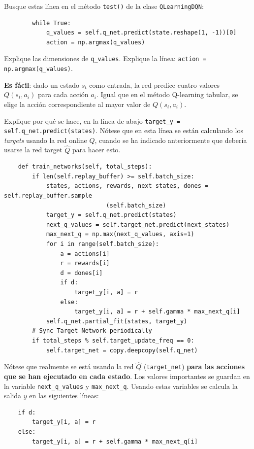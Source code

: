 \documentclass{article}
\begin{document}
\begin{exercise}
    Busque estas línea en el método \texttt{test()} de la clase \texttt{QLearningDQN}:
    
    \begin{verbatim}
        while True:
            q_values = self.q_net.predict(state.reshape(1, -1))[0]
            action = np.argmax(q_values)
    \end{verbatim}
    Explique las dimensiones de \texttt{q\_values}. Explique la línea: \texttt{action = np.argmax(q\_values)}.
\end{exercise}
\textbf{Es fácil}: dado un estado $s_t$ como entrada, la red predice cuatro valores $Q(s_t, a_i)$ para cada acción $a_i$. Igual que en el método Q-learning tabular, se elige la acción correspondiente al mayor valor de $Q(s_t, a_i)$. 

\begin{exercise}
    Explique por qué se hace, en la línea de abajo 
    \texttt{target\_y = self.q\_net.predict(states)}. Nótese que en esta línea se están calculando los \textit{targets} usando la red online $Q$, cuando se ha indicado anteriormente que debería usarse la red target $\hat{Q}$ para hacer esto.
    \begin{small}    
        \begin{verbatim}
    def train_networks(self, total_steps):
        if len(self.replay_buffer) >= self.batch_size:
            states, actions, rewards, next_states, dones = self.replay_buffer.sample
                             (self.batch_size)
            target_y = self.q_net.predict(states)
            next_q_values = self.target_net.predict(next_states)
            max_next_q = np.max(next_q_values, axis=1)
            for i in range(self.batch_size):
                a = actions[i]
                r = rewards[i]
                d = dones[i]
                if d:
                    target_y[i, a] = r
                else:
                    target_y[i, a] = r + self.gamma * max_next_q[i]
            self.q_net.partial_fit(states, target_y)
        # Sync Target Network periodically
        if total_steps % self.target_update_freq == 0:
            self.target_net = copy.deepcopy(self.q_net)
        \end{verbatim}
    \end{small}
\end{exercise}

Nótese que realmente se está usando la red $\hat{Q}$ (\texttt{target\_net}) \textbf{para las acciones que se han ejecutado en cada estado}. Los valores importantes se guardan en la variable \texttt{next\_q\_values} y \texttt{max\_next\_q}. Usando estas variables se calcula la salida $y$ en las siguientes líneas:
\begin{verbatim}
    if d:
        target_y[i, a] = r
    else:
        target_y[i, a] = r + self.gamma * max_next_q[i]
\end{verbatim}
\end{document}
